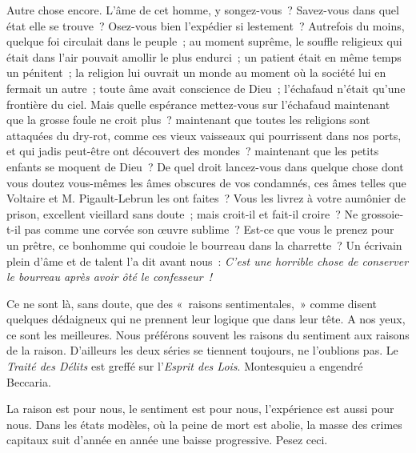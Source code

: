 \documentclass[french,twoside]{book} %
\begin{document}
 Autre chose encore. L’âme de cet homme, y songez-vous ? Savez-vous dans quel état elle se trouve ? Osez-vous bien l’expédier si lestement ? Autrefois du moins, quelque foi circulait dans le peuple ; au moment suprême, le souffle religieux qui était dans l’air pouvait amollir le plus endurci ; un patient était en même temps un pénitent ; la religion lui ouvrait un monde au moment où la société lui en fermait un autre ; toute âme avait conscience de Dieu ; l’échafaud n’était qu’une frontière du ciel. Mais quelle espérance mettez-vous sur l’échafaud maintenant que la grosse foule ne croit plus ? maintenant que toutes les religions sont attaquées du dry-rot, comme ces vieux vaisseaux qui pourrissent dans nos ports, et qui jadis peut-être ont découvert des mondes ? maintenant que les petits enfants se moquent de Dieu ? De quel droit lancez-vous dans quelque chose dont vous doutez vous-mêmes les âmes obscures de vos condamnés, ces âmes telles que Voltaire et M. Pigault-Lebrun les ont faites ? Vous les livrez à votre aumônier de prison, excellent vieillard sans doute ; mais croit-il et fait-il croire ? Ne grossoie-t-il pas comme une corvée son œuvre sublime ? Est-ce que vous le prenez pour un prêtre, ce bonhomme qui coudoie le bourreau dans la charrette ? Un écrivain plein d’âme et de talent l’a dit avant nous : \emph{C’est une horrible chose de conserver le bourreau après avoir ôté le confesseur !}\par
Ce ne sont là, sans doute, que des « raisons sentimentales, » comme disent quelques dédaigneux qui ne prennent leur logique que dans leur tête. A nos yeux, ce sont les meilleures. Nous préférons souvent les raisons du sentiment aux raisons de la raison. D’ailleurs les deux séries se  tiennent toujours, ne l’oublions pas. Le \emph{Traité des Délits} est greffé sur l’\emph{Esprit des Lois}. Montesquieu a engendré Beccaria.\par
La raison est pour nous, le sentiment est pour nous, l’expérience est aussi pour nous. Dans les états modèles, où la peine de mort est abolie, la masse des crimes capitaux suit d’année en année une baisse progressive. Pesez ceci.\par
\end{document}
